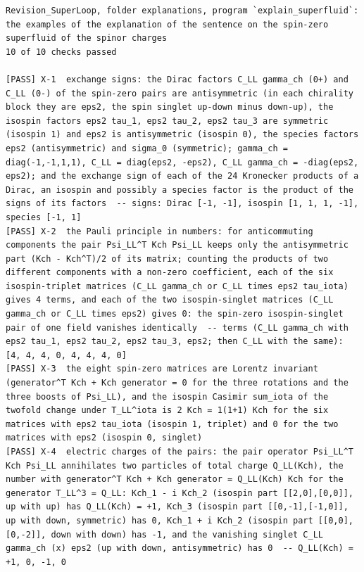 \documentclass[
  10pt,
]{article}
\begin{document}
\begin{verbatim}
Revision_SuperLoop, folder explanations, program `explain_superfluid`: the examples of the explanation of the sentence on the spin-zero superfluid of the spinor charges
10 of 10 checks passed

[PASS] X-1  exchange signs: the Dirac factors C_LL gamma_ch (0+) and C_LL (0-) of the spin-zero pairs are antisymmetric (in each chirality block they are eps2, the spin singlet up-down minus down-up), the isospin factors eps2 tau_1, eps2 tau_2, eps2 tau_3 are symmetric (isospin 1) and eps2 is antisymmetric (isospin 0), the species factors eps2 (antisymmetric) and sigma_0 (symmetric); gamma_ch = diag(-1,-1,1,1), C_LL = diag(eps2, -eps2), C_LL gamma_ch = -diag(eps2, eps2); and the exchange sign of each of the 24 Kronecker products of a Dirac, an isospin and possibly a species factor is the product of the signs of its factors  -- signs: Dirac [-1, -1], isospin [1, 1, 1, -1], species [-1, 1]
[PASS] X-2  the Pauli principle in numbers: for anticommuting components the pair Psi_LL^T Kch Psi_LL keeps only the antisymmetric part (Kch - Kch^T)/2 of its matrix; counting the products of two different components with a non-zero coefficient, each of the six isospin-triplet matrices (C_LL gamma_ch or C_LL times eps2 tau_iota) gives 4 terms, and each of the two isospin-singlet matrices (C_LL gamma_ch or C_LL times eps2) gives 0: the spin-zero isospin-singlet pair of one field vanishes identically  -- terms (C_LL gamma_ch with eps2 tau_1, eps2 tau_2, eps2 tau_3, eps2; then C_LL with the same): [4, 4, 4, 0, 4, 4, 4, 0]
[PASS] X-3  the eight spin-zero matrices are Lorentz invariant (generator^T Kch + Kch generator = 0 for the three rotations and the three boosts of Psi_LL), and the isospin Casimir sum_iota of the twofold change under T_LL^iota is 2 Kch = 1(1+1) Kch for the six matrices with eps2 tau_iota (isospin 1, triplet) and 0 for the two matrices with eps2 (isospin 0, singlet)
[PASS] X-4  electric charges of the pairs: the pair operator Psi_LL^T Kch Psi_LL annihilates two particles of total charge Q_LL(Kch), the number with generator^T Kch + Kch generator = Q_LL(Kch) Kch for the generator T_LL^3 = Q_LL: Kch_1 - i Kch_2 (isospin part [[2,0],[0,0]], up with up) has Q_LL(Kch) = +1, Kch_3 (isospin part [[0,-1],[-1,0]], up with down, symmetric) has 0, Kch_1 + i Kch_2 (isospin part [[0,0],[0,-2]], down with down) has -1, and the vanishing singlet C_LL gamma_ch (x) eps2 (up with down, antisymmetric) has 0  -- Q_LL(Kch) = +1, 0, -1, 0

\end{verbatim}
\end{document}

